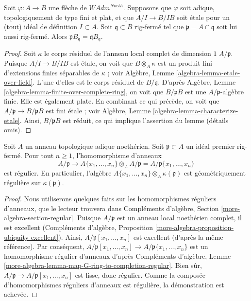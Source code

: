 \begin{lemma}
\label{lemma-rig-closed-point-etale}
Soit $\varphi : A \to B$ une flèche de $\textit{WAdm}^{Noeth}$.
Supposons que $\varphi$ soit adique, topologiquement de type fini et plat,
et que $A/I \to B/IB$ soit étale pour un (\resp tout)
idéal de définition $I \subset A$. Soit $\mathfrak q \subset B$
rig-fermé tel que $\mathfrak p = A \cap \mathfrak q$
soit lui aussi rig-fermé. Alors
$\mathfrak p B_\mathfrak q = \mathfrak q B_\mathfrak q$.
\end{lemma}

\begin{proof}
Soit $\kappa$ le corps résiduel de l'anneau local complet de dimension $1$
$A/\mathfrak p$. Puisque $A/I \to B/IB$ est étale, on voit que
$B \otimes_A \kappa$ est un produit fini d'extensions finies séparables
de $\kappa$ ; voir
Algèbre, Lemme \ref{algebra-lemma-etale-over-field}.
L'une d'elles est le corps résiduel de $B/\mathfrak q$.
D'après Algèbre, Lemme \ref{algebra-lemma-finite-over-complete-ring}, on voit que
$B/\mathfrak p B$ est une $A/\mathfrak p$-algèbre finie.
Elle est également plate. En combinant ce qui précède,
on voit que $A/\mathfrak p  \to B /\mathfrak p B$
est fini étale ; voir
Algèbre, Lemme \ref{algebra-lemma-characterize-etale}.
Ainsi, $B/\mathfrak p B$ est réduit, ce qui implique l'assertion du
lemme (détails omis).
\end{proof}

\begin{lemma}
\label{lemma-fibre-regular}
Soit $A$ un anneau topologique adique noethérien.
Soit $\mathfrak p \subset A$ un idéal premier rig-fermé.
Pour tout $n \geq 1$, l'homomorphisme d'anneaux
$$
A/\mathfrak p
\longrightarrow
A\{x_1, \ldots, x_n\} \otimes_A A/\mathfrak p =
A/\mathfrak p\{x_1, \ldots, x_n\}
$$
est régulier. En particulier, l'algèbre
$A\{x_1, \ldots, x_n\} \otimes_A \kappa(\mathfrak p)$
est géométriquement régulière sur $\kappa(\mathfrak p)$.
\end{lemma}

\begin{proof}
Nous utiliserons quelques faits sur les homomorphismes réguliers d'anneaux,
que le lecteur trouvera dans Compléments d'algèbre, Section \ref{more-algebra-section-regular}.
Puisque $A/\mathfrak p$ est un anneau local noethérien complet, il
est excellent (Compléments d'algèbre, Proposition
\ref{more-algebra-proposition-ubiquity-excellent}).
Ainsi, $A/\mathfrak p[x_1, \ldots, x_n]$ est excellent
(d'après la même référence). Par conséquent,
$A/\mathfrak p[x_1, \ldots, x_n] \to A/\mathfrak p\{x_1, \ldots, x_n\}$
est un homomorphisme régulier d'anneaux d'après
Compléments d'algèbre, Lemme
\ref{more-algebra-lemma-map-G-ring-to-completion-regular}.
Bien sûr, $A/\mathfrak p \to A/\mathfrak p[x_1, \ldots, x_n]$
est lisse, donc régulier. Comme la composée d'homomorphismes réguliers
d'anneaux est régulière, la démonstration est achevée.
\end{proof}







